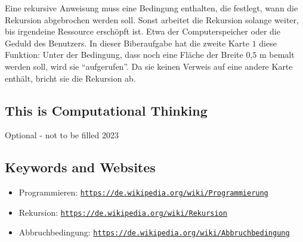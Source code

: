 \documentclass[a4paper,11pt]{report}
\newcommand{\BrochureUrlText}[1]{\texttt{#1}}
\begin{document}
Eine rekursive Anweisung muss eine Bedingung enthalten, die festlegt, wann die Rekursion abgebrochen werden soll. Sonst arbeitet die Rekursion solange weiter, bis irgendeine Ressource erschöpft ist. Etwa der Computerspeicher oder die Geduld des Benutzers.  In dieser Biberaufgabe hat die zweite Karte $1$ diese Funktion:  Unter der Bedingung, dass noch eine Fläche der Breite $0$,$5$ m bemalt werden soll, wird sie \enquote{aufgerufen}.  Da sie keinen Verweis auf eine andere Karte enthält, bricht sie die Rekursion ab.


\subsection*{This is Computational Thinking}

Optional - not to be filled 2023

{\raggedright

\subsection*{Keywords and Websites}

\begin{itemize}
  \item Programmieren: \href{https://de.wikipedia.org/wiki/Programmierung}{\BrochureUrlText{https://de.wikipedia.org/wiki/Programmierung}}
  \item Rekursion: \href{https://de.wikipedia.org/wiki/Rekursion}{\BrochureUrlText{https://de.wikipedia.org/wiki/Rekursion}}
  \item Abbruchbedingung: \href{https://de.wikipedia.org/wiki/Abbruchbedingung}{\BrochureUrlText{https://de.wikipedia.org/wiki/Abbruchbedingung}}
\end{itemize}


}
\end{document}
